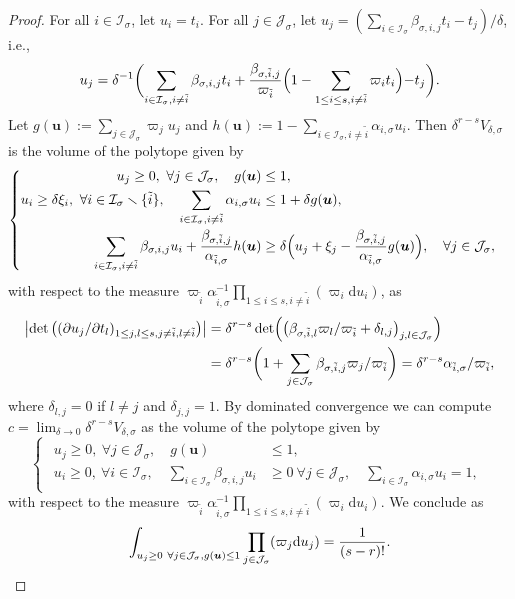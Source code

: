 \documentclass[11pt]{article}
\newcommand{\ie}{i.e.,\xspace}
\numberwithin{equation}{section}
\newcommand{\bfu}{\boldsymbol{u}}
\newcommand{\ii}[1]{\mathcal{J}_{#1}}
\newcommand{\ic}[1]{\mathcal{I}_{#1}}
\theoremstyle{definition}
\numberwithin{theorem}{section}
\begin{document}
\begin{proof}
For all $i\in\ic{\sigma}$, let $u_i=t_i$.
For all $j\in\ii{\sigma}$, let $u_j=\left(\sum_{i\in\ic{\sigma}} \beta_{\sigma, i,j}t_i -t_j \right)/\delta$, \ie \[
u_j
= \delta^{-1}\biggl(\sum_{i\in\ic{\sigma},i\neq\tilde i} \beta_{\sigma, i,j}t_i
+\frac{\beta_{\sigma,\tilde i , j}}{\varpi_{\tilde i}}
\Bigl(1- \sum_{1\leq i\leq s, i\neq \tilde i} \varpi_i t_i \Bigl) -t_j \biggr).
\]
Let $g(\bfu):=\sum_{j\in\ii{\sigma}}\varpi_j u_j$
and $h(\bfu):= 1-\sum_{i\in\ic{\sigma},i\neq \tilde i} \alpha_{i,\sigma}u_i$.
Then $\delta^{r-s}V_{\delta, \sigma}$ is the volume of the polytope given by
\[
\begin{cases}
\begin{aligned}
u_j\geq0, \ \forall j\in\ii{\sigma},
\quad
g(\bfu) &\leq 1,
\\
u_i\geq \delta\xi_i ,\ \forall i\in\ic{\sigma}\smallsetminus\{\tilde i\},
\quad
\sum_{ i\in\ic{\sigma},i\neq\tilde i} \alpha_{i,\sigma} u_i &\leq 1+\delta g(\bfu),
\\
\sum_{i\in\ic{\sigma}, i\neq\tilde i}\beta_{\sigma,i,j}u_i
+\frac{\beta_{\sigma,\tilde i,j}}{\alpha_{\tilde i,\sigma}}
h(\bfu)
&\geq \delta \Bigl(u_j+\xi_j-\frac{\beta_{\sigma,\tilde i,j}}{\alpha_{\tilde i,\sigma}} g(\bfu) \Bigr), \quad\forall j\in\ii{\sigma}, 
\end{aligned}
\end{cases}
\]
with respect to the measure
$\varpi_{\tilde i}\alpha_{\tilde i,\sigma}^{-1}
\prod_{1\leq i\leq s, i\neq\tilde i}(\varpi_i\mathrm du_i)$, as
\begin{align*}
\left|\det\left((\partial u_j/\partial t_l)_{1\leq j,l\leq s, j\neq\tilde i,l\neq\tilde i}\right)\right|
&=\delta^{r-s}\det\Bigl(\bigl(\beta_{\sigma, \tilde i, l}\varpi_l/\varpi_{\tilde i} + \delta_{l,j}\bigr)_{j,l\in\ii{\sigma}}\Bigr)\\
&=\delta^{r-s} \biggl(1+ \sum_{j\in\ii{\sigma}}\beta_{\sigma, \tilde i, j}\varpi_j/\varpi_{\tilde i} \biggr)
= \delta^{r-s}\alpha_{\tilde i,\sigma}/\varpi_{\tilde i},
\end{align*}
where $\delta_{l,j}=0$ if $l\neq j$ and $\delta_{j,j}=1$.
By dominated convergence
we can compute $c=\lim_{\delta\to 0}\delta^{r-s}V_{\delta, \sigma}$
as the volume of the polytope given by
\[
\begin{cases}
\begin{aligned}
u_j\geq0, \ \forall j\in\ii{\sigma},\quad
g(\bfu)&\leq 1, \\
u_i\geq0, \ \forall i\in\ic{\sigma},
\quad \sum_{i\in\ic{\sigma}}\beta_{\sigma,i,j}u_i&\geq 0 \ \forall j\in\ii{\sigma},
\quad \sum_{i\in\ic{\sigma}}\alpha_{i,\sigma}u_i=1,
\end{aligned}
\end{cases}
\]
with respect to the measure
$\varpi_{\tilde i}\alpha_{\tilde i,\sigma}^{-1}\prod_{1\leq i\leq s, i\neq\tilde i}(\varpi_i\mathrm du_i)$.
We conclude as
\[
\int_{u_j\geq0 \ \forall j\in\ii{\sigma}, g(\bfu)\leq 1}
\prod_{j\in\ii{\sigma}}(\varpi_j\mathrm d u_j)
=\frac{1}{(s-r)!}.
\qedhere
\]
\end{proof}
\end{document}
